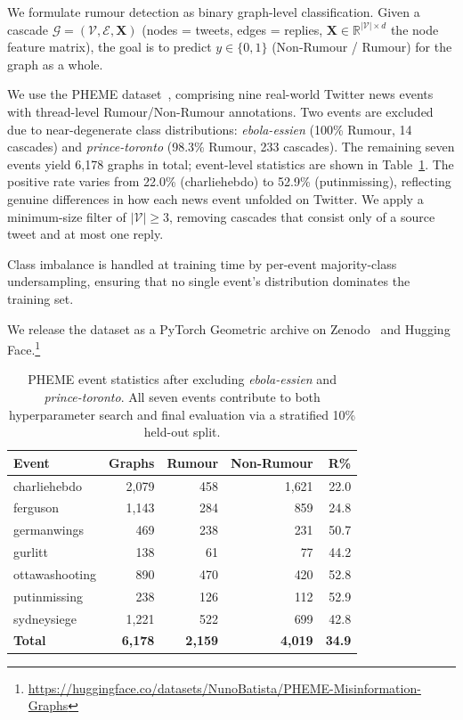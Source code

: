 \documentclass[runningheads]{llncs}
\begin{document}
We formulate rumour detection as binary graph-level classification. Given a
cascade $\mathcal{G} = (\mathcal{V}, \mathcal{E}, \mathbf{X})$ (nodes = tweets,
edges = replies, $\mathbf{X} \in \mathbb{R}^{|\mathcal{V}| \times d}$ the node
feature matrix), the goal is to predict $y \in \{0, 1\}$ (Non-Rumour / Rumour)
for the graph as a whole.

We use the PHEME dataset~\cite{zubiaga2016pheme}, comprising nine real-world
Twitter news events with thread-level Rumour/Non-Rumour annotations. Two events are excluded due to near-degenerate class distributions:
\textit{ebola-essien} (100\% Rumour, 14 cascades) and \textit{prince-toronto}
(98.3\% Rumour, 233 cascades). The remaining seven events yield 6,178 graphs
in total; event-level statistics are shown in Table~\ref{tab:dataset}. The positive rate
varies from 22.0\% (charliehebdo) to 52.9\% (putinmissing), reflecting genuine
differences in how each news event unfolded on Twitter. We apply a
minimum-size filter of $|\mathcal{V}| \geq 3$, removing cascades that consist
only of a source tweet and at most one reply.

Class imbalance is handled at training time by per-event majority-class
undersampling, ensuring that no single event's distribution dominates the
training set.

We release the dataset as a PyTorch Geometric archive on
Zenodo~\cite{batista2026pheme_pyg} and Hugging
Face.\footnote{\url{https://huggingface.co/datasets/NunoBatista/PHEME-Misinformation-Graphs}}

\begin{table}[t]
\caption{PHEME event statistics after excluding \textit{ebola-essien} and
\textit{prince-toronto}. All seven events contribute to both hyperparameter
search and final evaluation via a stratified 10\% held-out split.}
\label{tab:dataset}
\centering
\begin{tabular}{lrrrr}
\toprule
Event & Graphs & Rumour & Non-Rumour & R\% \\
\midrule
charliehebdo  & 2{,}079 & 458 & 1{,}621 & 22.0 \\
ferguson      & 1{,}143 & 284 &   859   & 24.8 \\
germanwings   &   469   & 238 &   231   & 50.7 \\
gurlitt       &   138   &  61 &    77   & 44.2 \\
ottawashooting &  890   & 470 &   420   & 52.8 \\
putinmissing  &   238   & 126 &   112   & 52.9 \\
sydneysiege   & 1{,}221 & 522 &   699   & 42.8 \\
\midrule
\textbf{Total} & \textbf{6{,}178} & \textbf{2{,}159} & \textbf{4{,}019} & \textbf{34.9} \\
\bottomrule
\end{tabular}
\end{table}
\end{document}
